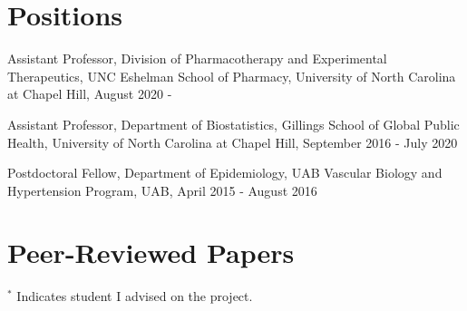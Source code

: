 \documentclass[10pt,letterpaper]{article}
\renewenvironment{itemize}{
  \begin{list}{}{
    \setlength{\leftmargin}{1.5em}
    \setlength{\itemsep}{0.25em}
    \setlength{\parskip}{0pt}
    \setlength{\parsep}{0.25em}
  }
}{
  \end{list}
}
\begin{document}
\section*{Positions}
\begin{itemize}
    \item Assistant Professor, Division of Pharmacotherapy and Experimental Therapeutics, UNC Eshelman School of Pharmacy, University of North Carolina at Chapel Hill, August 2020 - 
		\item Assistant Professor, Department of Biostatistics, Gillings School of Global Public Health, University of North Carolina at Chapel Hill, September 2016 - July 2020
	\item Postdoctoral Fellow, Department of Epidemiology, UAB Vascular Biology and Hypertension Program, UAB, April 2015 - August 2016
\end{itemize}

\section*{Peer-Reviewed Papers}

$^*$ Indicates student I advised on the project.
\end{document}
